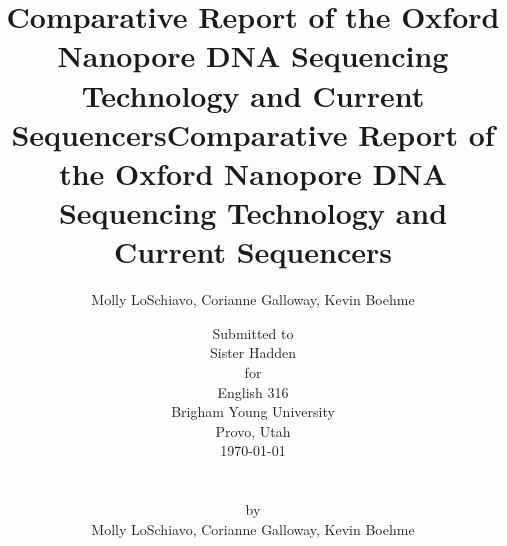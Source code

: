 \documentclass[12pt,letterpaper]{report}
\begin{document}

\title{Comparative Report of the Oxford Nanopore DNA Sequencing Technology and Current Sequencers}
\author{Molly LoSchiavo, Corianne Galloway, Kevin Boehme}
\date{}
\maketitle

\title{Comparative Report of the Oxford Nanopore DNA Sequencing Technology and Current Sequencers}
\author{Submitted to \\
Sister Hadden \\
for \\
English 316 \\
Brigham Young University \\
Provo, Utah \\
\today \\
\\
\\
by \\
Molly LoSchiavo, Corianne Galloway, Kevin Boehme}
\date{}
\maketitle
\end{document}
